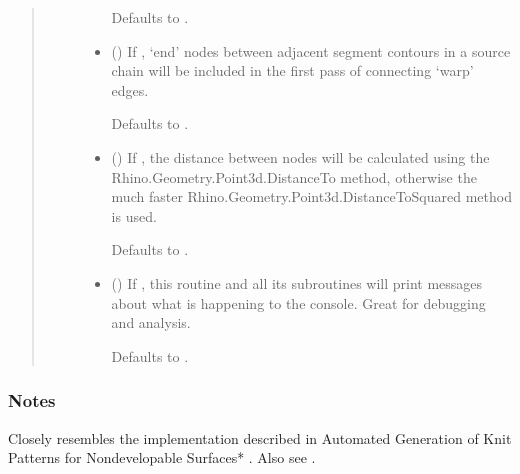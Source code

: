 \documentclass[letterpaper,10pt,english]{sphinxmanual}
\begin{document}
\begin{fulllineitems}
\begin{fulllineitems}
\begin{quote}
\begin{description}
\begin{itemize}
Defaults to .


\item {} 
 (\sphinxstyleliteralemphasis{\sphinxupquote{, }}) \textendash{} 
If , ‘end’ nodes between adjacent segment contours in a
source chain will be included in the first pass of connecting ‘warp’
edges.

Defaults to .


\item {} 
 () \textendash{} 
If , the distance between nodes will be calculated using the
Rhino.Geometry.Point3d.DistanceTo method, otherwise the much faster
Rhino.Geometry.Point3d.DistanceToSquared method is used.

Defaults to .


\item {} 
 (\sphinxstyleliteralemphasis{\sphinxupquote{, }}) \textendash{} 
If , this routine and all its subroutines will print
messages about what is happening to the console. Great for debugging
and analysis.

Defaults to .


\end{itemize}

\end{description}\end{quote}
\subsubsection*{Notes}

Closely resembles the implementation described in Automated Generation
of Knit Patterns for Non\sphinxhyphen{}developable Surfaces* \sphinxfootnotemark[1]. Also see  \sphinxfootnotemark[2].


\end{fulllineitems}
\end{fulllineitems}
\end{document}
